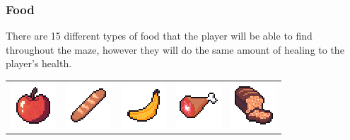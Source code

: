 \documentclass[../Main.tex]{subfiles}
\begin{document}
\begin{center}
\begin{tabular}{ | m{} | m{} | m{} |  m{} | m{} | }
                    \hline
                \end{tabular}
            \end{center}
        \subsubsection{Food}
            There are 15 different types of food that the player will be able to find throughout the maze, however they will do the same amount of healing to the player's health.
            \begin{center}
                \begin{tabular}{ m{} m{} m{} m{} m{} }
                    \centerline{\includegraphics{../res/textures/items/potions/food/Apple.png}} & \centerline{\includegraphics{../res/textures/items/potions/food/Baguette.png}} & \centerline{\includegraphics{../res/textures/items/potions/food/Banana.png}} & \centerline{\includegraphics{../res/textures/items/potions/food/Boar.png}} & \centerline{\includegraphics{../res/textures/items/potions/food/Bread.png}} \\

\end{tabular}
\end{center}
\end{document}
